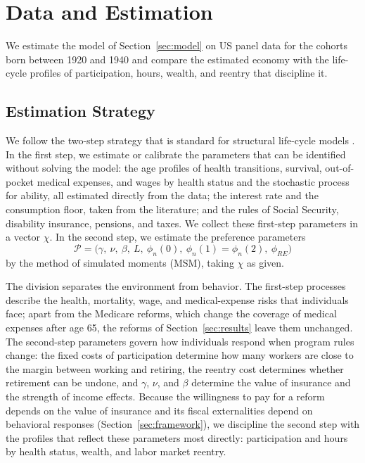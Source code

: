 \section{Data and Estimation}\label{sec:estimation}

We estimate the model of Section~\ref{sec:model} on US panel data for the cohorts born between 1920 and 1940 and compare the estimated economy with the life-cycle profiles of participation, hours, wealth, and reentry that discipline it.

\subsection{Estimation Strategy}

We follow the two-step strategy that is standard for structural life-cycle models \citep{Gourinchas2002,Cagetti2003}. In the first step, we estimate or calibrate the parameters that can be identified without solving the model: the age profiles of health transitions, survival, out-of-pocket medical expenses, and wages by health status and the stochastic process for ability, all estimated directly from the data; the interest rate and the consumption floor, taken from the literature; and the rules of Social Security, disability insurance, pensions, and taxes. We collect these first-step parameters in a vector $\chi$. In the second step, we estimate the preference parameters
\[
\mathcal{P}=\big(\gamma,\ \nu,\ \beta,\ L,\ \phi_n(0),\ \phi_n(1)=\phi_n(2),\ \phi_{RE}\big)
\]
by the method of simulated moments (MSM), taking $\chi$ as given.

The division separates the environment from behavior. The first-step processes describe the health, mortality, wage, and medical-expense risks that individuals face; apart from the Medicare reforms, which change the coverage of medical expenses after age 65, the reforms of Section~\ref{sec:results} leave them unchanged. The second-step parameters govern how individuals respond when program rules change: the fixed costs of participation determine how many workers are close to the margin between working and retiring, the reentry cost determines whether retirement can be undone, and $\gamma$, $\nu$, and $\beta$ determine the value of insurance and the strength of income effects. Because the willingness to pay for a reform depends on the value of insurance and its fiscal externalities depend on behavioral responses (Section~\ref{sec:framework}), we discipline the second step with the profiles that reflect these parameters most directly: participation and hours by health status, wealth, and labor market reentry.

